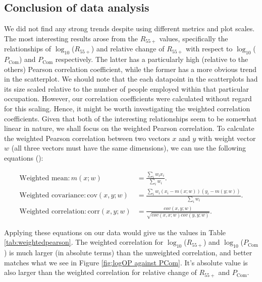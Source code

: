 \documentclass[11pt]{article}
\begin{document}
\subsection{Conclusion of data analysis}
We did not find any strong trends despite using different metrics and plot scales. The most interesting results arose from the $R_{55+}$ values, specifically the relationships of $\log_{10}$($R_{55+}$) and relative change of $R_{55+}$ with respect to $\log_{10}$($P_{\text{Com}}$) and $P_{\text{Com}}$ respectively. The latter has a particularly high (relative to the others) Pearson correlation coefficient, while the former has a more obvious trend in the scatterplot. We should note that the each datapoint in the scatterplots had its size scaled relative to the number of people employed within that particular occupation. However, our correlation coefficients were calculated without regard for this scaling. Hence, it might be worth investigating the weighted correlation coefficients. Given that both of the interesting relationships seem to be somewhat linear in nature, we shall focus on the weighted Pearson correlation. To calculate the weighted Pearson correlation between two vectors $x$ and $y$ with weight vector $w$ (all three vectors must have the same dimensions), we can use the following equations (\cite{bailey2018weighted}):

\begin{equation} \label{eq1}
	\begin{split}
		\text{Weighted mean}: m(x; w) & = \frac{\sum_{i}w_{i}x_{i}}{\sum_{i}w_{i}}. \\
		\text{Weighted covariance}: \text{cov}(x, y; w) & = \frac{\sum_{i}w_{i}(x_{i}-m(x; w))(y_{i}-m(y; w))}{\sum_{i}w_{i}}. \\
		\text{Weighted correlation}: \text{corr}(x, y; w) & = \frac{cov(x, y; w)}{\sqrt{cov(x, x; w)cov(y, y; w)}}.
	\end{split}
	\end{equation}

Applying these equations on our data would give us the values in Table \ref{tab:weightedpearson}. The weighted correlation for $\log_{10}$($R_{55+}$) and $\log_{10}$($P_{\text{Com}}$) is much larger (in absolute terms) than the unweighted correlation, and better matches what we see in Figure \ref{fig:logOP against PCom}. It's absolute value is also larger than the weighted correlation for relative change of $R_{55+}$ and $P_{\text{Com}}$.
\end{document}
